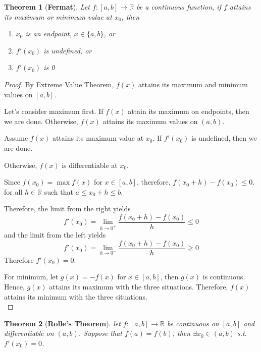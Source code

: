 \documentclass[12pt]{article}
\theoremstyle{plain}
\newtheorem{theorem}{Theorem}[section]
\newcommand{\dlim}{\displaystyle\lim\limits}
\begin{document}
		\begin{theorem}[\textbf{Fermat}]
			Let $f:[a,b] \to \mathbb{R}$ be a continuous function, 
			if $f$ attains its maximum or minimum value at $x_0$,
			then 
			\begin{enumerate}
				\item $x_0$ is an endpoint, $x\in\{a, b\}$, \qquad or 
				\item $f'(x_0)$ is undefined,  \qquad \qquad  \quad or 
				\item $f'(x_0)$ is 0\\
			\end{enumerate}
		\end{theorem}
		\begin{proof}
			By Extreme Value Theorem, $f(x)$ attains its maximum and minimum values
			on $[a,b]$.
			
			Let's consider maximum first. 
			If $f(x)$ attain its maximum on endpoints, then	we are done. 
			Otherwise, $f(x)$ attains its maximum values on $(a,b)$.

			Assume $f(x)$ attains its maximum value at $x_0$. If $f'(x_0)$
			is undefined, then we are done. 

			Otherwise, $f(x)$ is differentiable at $x_0$. 

			Since $f(x_0) = \max f(x)$ for $x\in [a,b]$, therefore, 
			$f(x_0+h)-f(x_0)\leq 0$. for all $h \in \mathbb{R}$ such that 
			$a\leq x_0+h\leq b$. 

			Therefore, the limit from the right yields
			\[
				f'(x_0) = \dlim_{h\to 0^+}\frac{f(x_0+h)-f(x_0)}h\leq 0
			\]
			and the limit from the left yields
			\[
				f'(x_0) = \dlim_{h\to 0^-}\frac{f(x_0+h)-f(x_0)}h\geq 0
			\]
			Therefore $f'(x_0) = 0$. 

			For minimum, let $g(x)=-f(x)$ for $x\in[a,b]$, then $g(x)$ is continuous.
			Hence, $g(x)$ attains its maximum with the three situations. Therefore,
			$f(x)$ attains its minimum with the three situations. \\
		\end{proof}

		\begin{theorem}[\textbf{Rolle's Theorem}]
			let $f:[a,b]\to\mathbb{R}$ be continuous on $[a,b]$ and differentiable
			on $(a, b)$. 
			Suppose that $f(a) = f(b)$, then $\exists x_0\in(a,b)$ s.t. $f'(x_0)=0$.\\ 
		\end{theorem}
		
\end{document}
